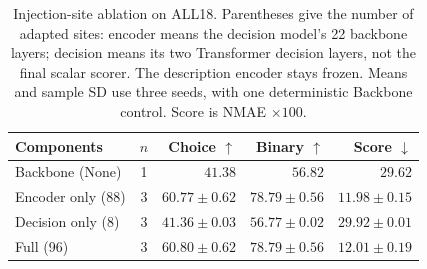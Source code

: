 \begin{table}[t]
\centering
\footnotesize
\setlength{\tabcolsep}{3pt}
\caption{Injection-site ablation on ALL18. Parentheses give the number of adapted sites: encoder means the decision model's 22 backbone layers; decision means its two Transformer decision layers, not the final scalar scorer. The description encoder stays frozen. Means and sample SD use three seeds, with one deterministic Backbone control. Score is NMAE $\times100$.}
\label{tab:injection-sites}
\begin{tabular}{lcrrr}
\toprule
Components & $n$ & Choice $\uparrow$ & Binary $\uparrow$ & Score $\downarrow$ \\
\midrule
Backbone (None) & 1 & $41.38$ & $56.82$ & $29.62$ \\
Encoder only (88) & 3 & $60.77 \pm 0.62$ & $78.79 \pm 0.56$ & $11.98 \pm 0.15$ \\
Decision only (8) & 3 & $41.36 \pm 0.03$ & $56.77 \pm 0.02$ & $29.92 \pm 0.01$ \\
Full (96) & 3 & $60.80 \pm 0.62$ & $78.79 \pm 0.56$ & $12.01 \pm 0.19$ \\
\bottomrule
\end{tabular}
\end{table}
